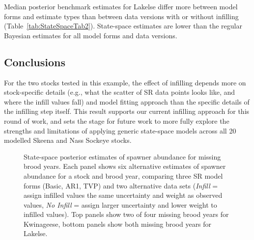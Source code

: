 \documentclass[french,11pt]{book}
\begin{document}
Median posterior benchmark estimates for Lakelse differ more between model forms and estimate types than between data versions with or without infilling (Table~\ref{tab:StateSpaceTab2}). State-space estimates are lower than the regular Bayesian estimates for all model forms and data versions.

\subsection{Conclusions}\label{conclusions-1}

For the two stocks tested in this example, the effect of infilling depends more on stock-specific details (e.g., what the scatter of SR data points looks like, and where the infill values fall) and model fitting approach than the specific details of the infilling step itself. This result supports our current infilling approach for this round of work, and sets the stage for future work to more fully explore the strengths and limitations of applying generic state-space models across all 20 modelled Skeena and Nass Sockeye stocks.

\clearpage


\begin{figure}[htb]

{\centering {} 

}

\caption{State-space posterior estimates of spawner abundance for missing brood years. Each panel shows six alternative estimates of spawner abundance for a stock and brood year, comparing three SR model forms (Basic, AR1, TVP) and two alternative data sets (\emph{Infill} = assign infilled values the same uncertainty and weight as observed values, \emph{No Infill} = assign larger uncertainty and lower weight to infilled values). Top panels show two of four missing brood years for Kwinageese, bottom panels show both missing brood years for Lakelse.}\label{fig:StateSpaceComp}
\end{figure}
\clearpage
\end{document}
